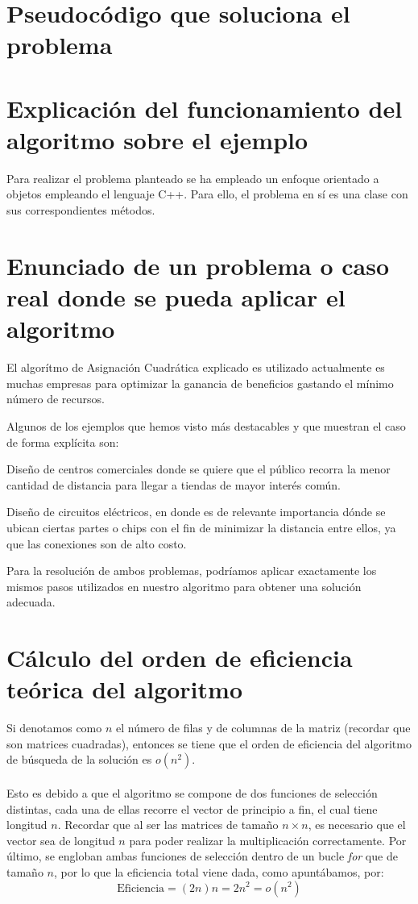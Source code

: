 \documentclass[11pt, a4paper]{article}
\theoremstyle{theorem-style}
\theoremstyle{definition-style}
\theoremstyle{remark-style}
\theoremstyle{example-style}
\begin{document}
\section{Pseudocódigo que soluciona el problema}

\section{Explicación del funcionamiento del algoritmo sobre el ejemplo}
Para realizar el problema planteado se ha empleado un enfoque orientado a objetos empleando el lenguaje C++. Para ello, el problema en sí es una clase con sus correspondientes métodos.
\section{Enunciado de un problema o caso real donde se pueda aplicar el algoritmo}

El algorítmo de Asignación Cuadrática explicado es utilizado actualmente es muchas empresas para optimizar la ganancia de beneficios gastando el mínimo número de recursos.

Algunos de los ejemplos que hemos visto más destacables y que muestran el caso de forma explícita son:

Diseño de centros comerciales donde se quiere que el público recorra
la menor cantidad de distancia para llegar a tiendas de mayor interés común. 

Diseño de circuitos eléctricos, en donde es de relevante importancia
dónde se ubican ciertas partes o chips con el fin de minimizar la
distancia entre ellos, ya que las conexiones son de alto costo.

Para la resolución de ambos problemas, podríamos aplicar exactamente los mismos pasos utilizados en nuestro algoritmo para obtener una solución adecuada.

\section{Cálculo del orden de eficiencia teórica del algoritmo }
Si denotamos como $n$ el número de filas y de columnas de la matriz (recordar que son matrices cuadradas), entonces se tiene que el orden de eficiencia del algoritmo de búsqueda de la solución es $o(n^2)$.
\paragraph{}
Esto es debido a que el algoritmo se compone de dos funciones de selección distintas, cada una de ellas recorre el vector de principio a fin, el cual tiene longitud $n$.  Recordar que al ser las matrices de tamaño $n\times n$, es necesario que el vector sea de longitud $n$ para poder realizar la multiplicación correctamente. Por último, se engloban ambas funciones de selección dentro de un bucle \textit{for} que de tamaño $n$, por lo que la eficiencia total viene dada, como apuntábamos, por:
$$\textrm{Eficiencia}= (2n)n=2n^2=o(n^2)$$
\end{document}
